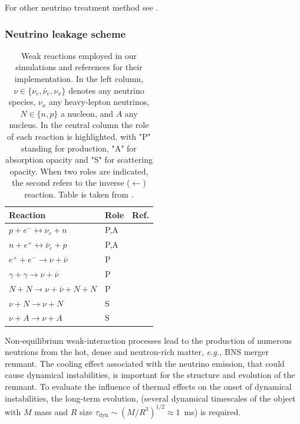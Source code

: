 \documentclass[11pt,a4paper,headinclude=true,DIV=14,BCOR=8mm,chapterprefix,listof=totoc,twoside,openright,abstracton]{scrbook}
\begin{document}
For other neutrino treatment method see \cite{vanRiper:1981mko,Ruffert:1995fs,Rosswog:2003rv,OConnor:2009iuz,Sekiguchi:2010ep,Neilsen:2014hha,Perego:2015agy,Ardevol-Pulpillo:2018btx}.


\subsubsection{Neutrino leakage scheme}


\begin{table}
    \caption{
        Weak reactions employed in our simulations and references for their implementation.
        In the left column, $\nu \in \{\nu_e, \bar{\nu}_e, \nu_{x}\}$ denotes any neutrino species, 
        $\nu_{x}$ any heavy-lepton neutrinos, $N \in\{n, p\}$ a nucleon, and $A$ any nucleus.
        In the central column the role of each reaction is highlighted, with "P" standing for 
        production, "A" for absorption opacity and "S" for scattering opacity. When two roles are
        indicated, the second refers to the inverse ($\leftarrow$) reaction.
        Table is taken from \cite{Radice:2018pdn}.
    }
    \label{tab:leakage}
    \begin{center}
        \begin{tabular}{lll}
            \hline\hline
            Reaction & Role &  Ref. \\ 
            \hline
            $p + e^- \leftrightarrow \nu_e + n $          & P,A & \cite{Bruenn:1985}  \\
            $n + e^+ \leftrightarrow \bar{\nu}_{e} + p $  & P,A & \cite{Bruenn:1985}  \\
            $e^+ + e^- \rightarrow \nu + \bar{\nu}$       & P & \cite{Ruffert:1995fs} \\
            $\gamma + \gamma \rightarrow \nu + \bar{\nu}$ & P & \cite{Ruffert:1995fs} \\
            $N + N \rightarrow \nu + \bar{\nu} + N  + N$  & P & \cite{Burrows:2004vq} \\
            $\nu + N \rightarrow \nu + N$                 & S & \cite{Ruffert:1995fs} \\
            $\nu + A \rightarrow \nu + A$                 & S & \cite{Shapiro:1983du} \\
            \hline\hline
        \end{tabular}
    \end{center}
\end{table}

Non-equilibrium weak-interaction processes lead to the production of numerous neutrions from the hot, dense and neutron-rich matter, \textit{e.g.,} BNS merger remnant. The cooling effect associated with the neutrino emission, that could cause dynamical instabilities, is important for the structure and evolution of the remnant. 
To evaluate the influence of thermal effects on the onset of dynamical instabilities, the long-term evolution, (several dynamical timescales of the object with $M$ mass and $R$ size $\tau_{\text{dyn}}\sim(M/R^3)^{1/2}\approx 1$~ms) is required.
\end{document}
